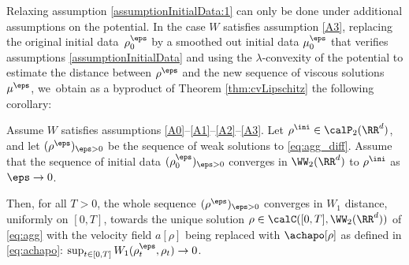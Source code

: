 Relaxing assumption \eqref{assumptionInitialData:1} can only be done under additional assumptions on the potential. In the case $W$ satisfies assumption \eqref{A3}, replacing the original initial data~$\rho^\eps_0$ by a smoothed out initial data $\mu_0^\eps$ that verifies assumptions \eqref{assumptionInitialData} and using the $\lambda$\nobreakdash-convexity of the potential to estimate the distance between $\rho^\eps$ and the new sequence of viscous solutions $\mu^\eps$, we~obtain as a byproduct of Theorem \ref{thm:cvLipschitz} the following corollary:
\begin{corollary}\label{coroll:cvLambdaCvx}
Assume $W$ satisfies assumptions \eqref{A0}--\eqref{A1}--\eqref{A2}--\eqref{A3}. Let $\rho^{\ini} \in \calP_2(\RR^d)$, and let $(\rho^\eps)_{\eps > 0}$ be the sequence of weak solutions to \eqref{eq:agg_diff}. Assume that the sequence of initial data $(\rho_0^\eps)_{\eps>0}$ converges in $\WW_2(\RR^d)$ to $\rho^{\ini}$ as $\eps \to 0$.

Then, for all $T>0$, the whole sequence $(\rho^\eps)_{\eps > 0}$ converges in $W_1$ distance, uniformly on $[0,T]$, towards the unique solution $\rho \in \calC([0,T], \WW _2(\RR^d))$ of \eqref{eq:agg} with the velocity field $a[\rho]$ being replaced with $\achapo[\rho]$ as defined in \eqref{eq:achapo}: $\sup_{t\in[0, T]} W_1(\rho_t^\eps,\rho_t) \to 0$.
\end{corollary}
